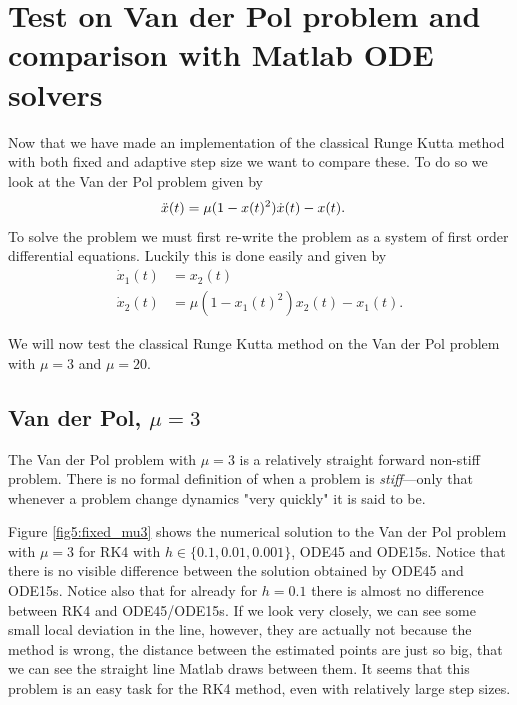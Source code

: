 \section{Test on Van der Pol problem and comparison with Matlab ODE solvers}
Now that we have made an implementation of the classical Runge Kutta method with both fixed and adaptive step size we want to compare these. To do so we look at the Van der Pol problem given by
\begin{align}
    \Ddot{x}(t) &= \mu (1-x(t)^2) \dot{x}(t) - x(t).
\end{align}
To solve the problem we must first re-write the problem as a system of first order differential equations. Luckily this is done easily and given by
\begin{align}
    \dot{x}_1(t) &= x_2(t) \\
    \dot{x}_2(t) &= \mu(1-x_1(t)^2) x_2(t) - x_1(t).
\end{align}

We will now test the classical Runge Kutta method on the Van der Pol problem with $\mu = 3$ and $\mu = 20$. 

\subsection{Van der Pol, $\mu = 3$}
The Van der Pol problem with $\mu = 3$ is a relatively straight forward non-stiff problem. There is no formal definition of when a problem is \textit{stiff}---only that whenever a problem change dynamics "very quickly" it is said to be. 

Figure \ref{fig5:fixed_mu3} shows the numerical solution to the Van der Pol problem with $\mu = 3$ for RK4 with $h \in \{0.1, 0.01, 0.001\}$, ODE45 and ODE15s. Notice that there is no visible difference between the solution obtained by ODE45 and ODE15s. Notice also that for already for $h=0.1$ there is almost no difference between RK4 and ODE45/ODE15s. If we look very closely, we can see some small local deviation in the line, however, they are actually not because the method is wrong, the distance between the estimated points are just so big, that we can see the straight line Matlab draws between them. It seems that this problem is an easy task for the RK4 method, even with relatively large step sizes.

